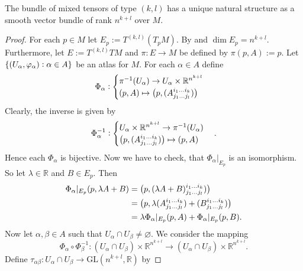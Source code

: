 \begin{proposition}
The bundle of mixed tensors of type $(k,l)$ has a unique natural structure as a smooth vector bundle of rank $n^{k + l}$ over $M$.
\label{prop:smooth_bundle}
\end{proposition}

\begin{proof}
For each $p \in M$ let $E_p := T^{(k,l)}(T_pM)$. By \cite[57]{lee:smooth_manifolds:2013} and \cite[313]{lee:smooth_manifolds:2013} $\dim E_p = n^{k + l}$. Furthermore, let $E := T^{(k,l)}TM$ and $\pi : E \to M$ be defined by $\pi(p,A) := p$. Let $\cbr[0]{(U_\alpha,\varphi_\alpha) : \alpha \in A}$ be an atlas for $M$. For each $\alpha \in A$ define
\begin{equation*}
\Phi_\alpha:\begin{cases}
\pi^{-1}(U_\alpha) \to U_\alpha \times \mathbb{R}^{n^{k + l}}\\
(p,A) \mapsto \del[1]{p,(A^{i_1\dots i_k}_{j_1\dots j_l})}
\end{cases}
\end{equation*}
Clearly, the inverse is given by
\begin{equation*}
\Phi^{-1}_\alpha:\begin{cases}
U_\alpha \times\mathbb{R}^{n^{k + l}} \to \pi^{-1}(U_\alpha)\\
\del[1]{p,(A^{i_1\dots i_k}_{j_1\dots j_l})} \mapsto (p,A)
\end{cases}.
\end{equation*}
Hence each $\Phi_\alpha$ is bijective. Now we have to check, that $\Phi_\alpha\vert_{E_p}$ is an isomorphism. So let $\lambda \in \mathbb{R}$ and $B \in E_p$. Then
\begin{align*}
\Phi_\alpha\vert_{E_p}(p,\lambda A + B) &= \del[1]{p,(\lambda A + B)^{i_1\dots i_k}_{j_1\dots j_l})}\\
&= \del[1]{p,\lambda (A^{i_1\dots i_k}_{j_1\dots j_l}) + (B^{i_1\dots i_k}_{j_1\dots j_l})}\\
&= \lambda\Phi_\alpha\vert_{E_p}(p,A) + \Phi_\alpha\vert_{E_p}(p,B).
\end{align*}
Now let $\alpha, \beta \in A$ such that $U_\alpha \cap U_\beta \neq \varnothing$. We consider the mapping
\begin{equation*}
\Phi_\alpha \circ \Phi_\beta^{-1} : (U_\alpha \cap U_\beta) \times \mathbb{R}^{n^{k + l}} \to (U_\alpha \cap U_\beta) \times \mathbb{R}^{n^{k + l}}.
\end{equation*}
Define $\tau_{\alpha\beta}: U_\alpha \cap U_\beta \to \mathrm{GL}(n^{k + l},\mathbb{R})$ by

\end{proof}
